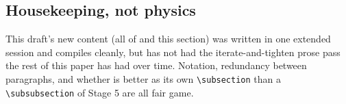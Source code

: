\subsection{Housekeeping, not physics}

This draft's new content (all of  and this section) was written in one
extended session and compiles cleanly, but has not had the iterate-and-tighten prose pass the
rest of this paper has had over time. Notation, redundancy between paragraphs, and whether
 is better as its own \texttt{\textbackslash subsection} than a
\texttt{\textbackslash subsubsection} of Stage 5 are all fair game.
